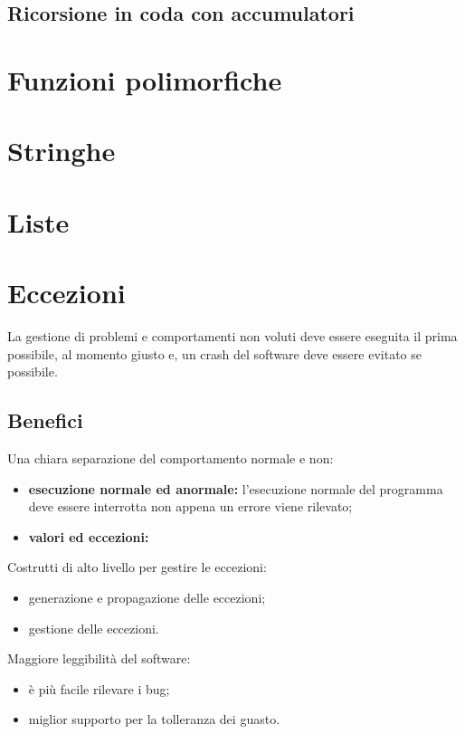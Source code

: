 \subsection{Ricorsione in coda con accumulatori}

\section{Funzioni polimorfiche}

\section{Stringhe}

\section{Liste}

\section{Eccezioni}
La gestione di problemi e comportamenti non voluti deve essere eseguita il
prima possibile, al momento giusto e, un crash del software deve essere
evitato se possibile.

\subsection{Benefici}
Una chiara separazione del comportamento normale e non:
\begin{itemize}
  \item \textbf{esecuzione normale ed anormale:} l'esecuzione normale del
    programma deve essere interrotta non appena un errore viene rilevato;
  \item \textbf{valori ed eccezioni:}
\end{itemize}


Costrutti di alto livello per gestire le eccezioni:
\begin{itemize}
  \item generazione e propagazione delle eccezioni;
  \item gestione delle eccezioni.
\end{itemize}

Maggiore leggibilità del software:
\begin{itemize}
  \item è più facile rilevare i bug;
  \item miglior supporto per la tolleranza dei guasto.
\end{itemize}

